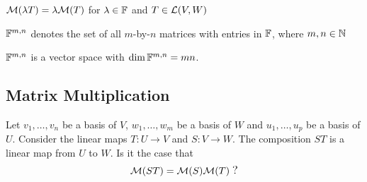 \setcounter{thm}{37}
\begin{thm}
  $\mathcal{M}(\lambda T) = \lambda \mathcal{M}(T)$ for $\lambda \in \mathbb{F}$ and $T \in \mathcal{L} (V,W)$
\end{thm}

\begin{mydef} 
  $\mathbb{F}^{m,n}$ denotes the set of all $m$-by-$n$ matrices with entries in $\mathbb{F}$, where $m,n \in \mathbb{N}$
\end{mydef}

\begin{thm} %
  \label{thm: the dimension of the vector space of all m by n matrices is mn}
  $\mathbb{F}^{m,n}$ is a vector space with $\dim \mathbb{F}^{m,n}=mn$.
\end{thm}


\subsection{Matrix Multiplication}

Let $v_1, \ldots, v_n$ be a basis of $V$, $w_1, \ldots, w_m$ be a basis of $W$ and $u_1, \ldots, u_p$ be a basis of $U$.
Consider the linear maps $T: U \to V$ and $S: V \to W$. The composition $ST$ is a linear map from $U$ to $W$. Is it the case that
\begin{equation}
  \mmatrix(ST) = \mmatrix(S)  \mmatrix(T) \; {\mathlarger ?}
\end{equation}


